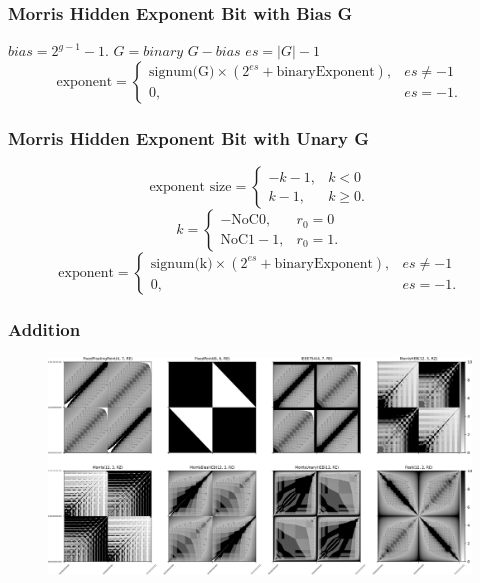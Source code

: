 \begin{frame}
    \frametitle{Morris Hidden Exponent Bit with Bias G}
    $\textit{bias}=2^{g-1}-1$. 
    $G=\textit{binary G} - \textit{bias}$
    $es=|G|-1$
    \begin{equation}
        \text{exponent} = \begin{cases}
        \text{signum(G)} \times ( 2^{es} + \text{binaryExponent} ), & es \neq -1\\
        0, & es=-1.
      \end{cases}
    \end{equation}
\end{frame}

\begin{frame}
    \frametitle{Morris Hidden Exponent Bit with Unary G}
    \begin{equation}
        \text{exponent size} = \begin{cases}
        -k - 1, & k < 0 \\
        k - 1, & k \ge 0.
      \end{cases}
    \end{equation}
    \begin{equation}
        k = \begin{cases}
        -\text{NoC0}, & r_0=0 \\
        \text{NoC1} - 1, & r_0=1.
      \end{cases}
    \end{equation}
    \begin{equation}
        \text{exponent} = \begin{cases}
        \text{signum(k)} \times ( 2^{es} + \text{binaryExponent} ), & es \neq -1\\
        0, & es=-1.
      \end{cases}
    \end{equation}
\end{frame}

\begin{frame}
    \frametitle{Addition}

\begin{figure}[tp]
    \includegraphics[width=\textwidth]{media/add.jpg}
\end{figure}

\end{frame}


